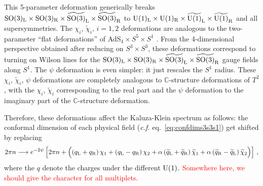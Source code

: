 \documentclass[a4paper, 11pt]{article}
\numberwithin{equation}{section}
\newcommand{\ts}[1]{\widetilde{#1}}
\newcommand{\SO}[1]{\mathrm{SO}( #1 )}
\newcommand{\+}{\oplus}
\newcommand{\EM}[1]{\textcolor{red}{#1}}
\begin{document}
This 5-parameter deformation generically breaks $\SO{3}_{\rm L}\times\SO{3}_{\rm R}\times\ts{\SO{3}}_{\rm L}\times\ts{\SO{3}}_{\rm R}$ to ${\rm U}(1)_{\rm L}\times{\rm U}(1)_{\rm R}\times\ts{{\rm U}(1)}_{\rm L}\times\ts{{\rm U}(1)}_{\rm R}$ and all supersymmetries. The $\chi_i$, $\ts{\chi}_i$, $i = 1, 2$ deformations are analogous to the two-parameter ``flat deformations'' \cite{Guarino:2021hrc} of AdS$_4 \times S^5 \times S^1$ \cite{Giambrone:2021zvp,Giambrone:2021wsm}. From the 4-dimensional perspective obtained after reducing on $S^3 \times S^3$, these deformations correspond to turning on Wilson lines for the $\SO{3}_{\rm L}\times\SO{3}_{\rm R}\times\ts{\SO{3}}_{\rm L}\times\ts{\SO{3}}_{\rm R}$ gauge fields along $S^1$. The $\psi$ deformation is even simpler: it just rescales the $S^1$ radius. These $\chi_i$, $\ts{\chi}_i$, $\psi$ deformations are completely analogous to $\mathbb{C}$-structure deformations of $T^2$, with the $\chi_i$, $\ts{\chi}_i$ corresponding to the real part and the $\psi$ deformation to the imaginary part of the $\mathbb{C}$-structure deformation.

Therefore, these deformations affect the Kaluza-Klein spectrum as follows: the conformal dimension of each physical field (\textit{c.f.} eq.~\eqref{eq:confdims3s3s1}) get shifted by replacing
\begin{equation} \label{eq:confdimshiftchi}
	2\pi n\longrightarrow e^{-2\psi} \left[ 2\pi n + \Big((q_{\rm L}+q_{\rm R})\,\chi_{1}+(q_{\rm L}-q_{\rm R})\,\chi_{2}+ \alpha\,(\ts{q}_{\rm L}+\ts{q}_{\rm R})\,\ts{\chi}_{1}+ \alpha\,(\ts{q}_{\rm R}-\ts{q}_{\rm L})\,\ts{\chi}_{2}\Big) \right]\,,
\end{equation}
where the $q$ denote the charges under the different ${\rm U}(1)$. \EM{Somewhere here, we should give the character for all multiplets.}
\end{document}
